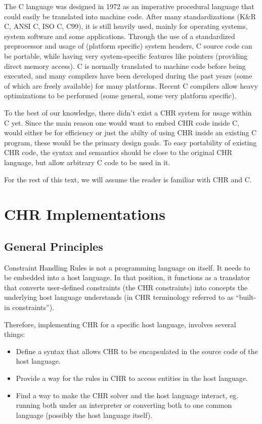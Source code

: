 \documentclass{llncs}
\begin{document}
The C language was designed in 1972 as an imperative procedural language that
could easily be translated into machine code. After many standardizations (K\&R C,
ANSI C, ISO C, C99), it is still heavily used, mainly for operating systems,
system software and some applications. Through the use of a standardized preprocessor
and usage of (platform specific) system headers, C source code can be portable,
while having very system-specific features like pointers (providing direct memory access).
C is normally translated to machine code before being executed, and many compilers
have been developed during the past years (some of which are freely available) for
many platforms. Recent C compilers allow heavy optimizations to be performed (some
general, some very platform specific).

To the best of our knowledge, there didn't exist a CHR system for usage within C
yet. Since the main reason one would want to embed CHR code inside C, would either
be for efficiency or just the abilty of using CHR inside an existing C program,
these would be the primary design goals. To easy portability of existing CHR
code, the syntax and semantics should be close to the original CHR language, but
allow arbitrary C code to be used in it.

For the rest of this text, we will assume the reader is familiar with CHR and C.

\section{CHR Implementations}

\subsection{General Principles}

Constraint Handling Rules is not a programming language on itself. It needs to be embedded
into a host language. In that position, it functions as a translator that converts
user-defined constraints (the CHR constraints) into concepts the underlying host language
understands (in CHR terminology referred to as ``built-in constraints'').

Therefore, implementing CHR for a specific host language, involves several things: \begin{itemize}
\item Define a syntax that allows CHR to be encapsulated in the source code of the host language.
\item Provide a way for the rules in CHR to access entities in the host language.
\item Find a way to make the CHR solver and the host language interact, eg. running both under an interpreter
      or converting both to one common language (possibly the host language itself).
\end{itemize}
\end{document}

